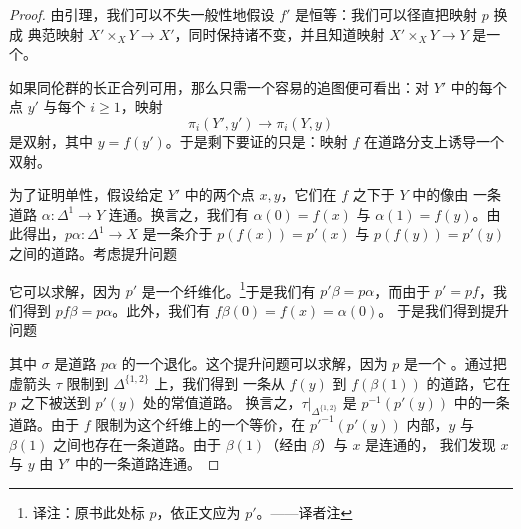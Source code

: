\begin{proof}
由\trReedy{}引理，我们可以不失一般性地假设 $f'$ 是恒等：我们可以径直把映射 $p$ 换成
典范映射 $X' \times_X Y \to X'$，同时保持诸\trFibre{}不变，并且知道映射
$X' \times_X Y \to Y$ 是一个\trEquivalence{}。

如果同伦群的长正合列可用，那么只需一个容易的追图便可看出：对 $Y'$ 中的每个点
$y'$ 与每个 $i \ge 1$，映射
\[
\pi_i(Y', y') \longrightarrow \pi_i(Y, y)
\]
是双射，其中 $y = f(y')$。于是剩下要证的只是：映射 $f$ 在道路分支上诱导一个
双射。

为了证明单性，假设给定 $Y'$ 中的两个点 $x, y$，它们在 $f$ 之下于 $Y$ 中的像由
一条道路 $\alpha\colon \Delta^1 \to Y$ 连通。换言之，我们有 $\alpha(0) = f(x)$
与 $\alpha(1) = f(y)$。由此得出，$p\alpha\colon \Delta^1 \to X$ 是一条介于
$p(f(x)) = p'(x)$ 与 $p(f(y)) = p'(y)$ 之间的道路。考虑提升问题
\begin{center}
\end{center}
它可以求解，因为 $p'$ 是一个纤维化。\footnote{译注：原书此处标 $p$，依正文应为
$p'$。——译者注}于是我们有 $p'\beta = p\alpha$，而由于
$p' = pf$，我们得到 $pf\beta = p\alpha$。此外，我们有 $f\beta(0) = f(x) = \alpha(0)$。
于是我们得到提升问题
\begin{center}
\end{center}
其中 $\sigma$ 是道路 $p\alpha$ 的一个退化。这个提升问题可以求解，因为 $p$ 是一个%
\trKanFibration{}。通过把虚箭头 $\tau$ 限制到 $\Delta^{\{1,2\}}$ 上，我们得到
一条从 $f(y)$ 到 $f(\beta(1))$ 的道路，它在 $p$ 之下被送到 $p'(y)$ 处的常值道路。
换言之，$\tau|_{\Delta^{\{1,2\}}}$ 是 $p^{-1}(p'(y))$ 中的一条道路。由于 $f$
限制为这个纤维上的一个\trHomotopy{}等价，在 $p'^{-1}(p'(y))$ 内部，$y$ 与
$\beta(1)$ 之间也存在一条道路。由于 $\beta(1)$（经由 $\beta$）与 $x$ 是连通的，
我们发现 $x$ 与 $y$ 由 $Y'$ 中的一条道路连通。


\end{proof}
